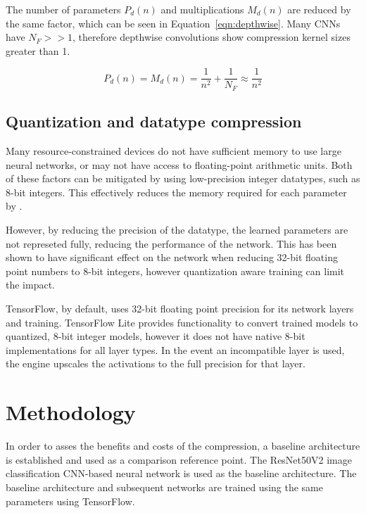 \documentclass{article}
\begin{document}
	The number of parameters $P_d(n)$ and multiplications $M_d(n)$ are reduced by the same factor, which can be seen in Equation~\ref{eqn:depthwise}. Many CNNs have $N_F >> 1$, therefore depthwise convolutions show compression kernel sizes greater than 1. 

	\begin{equation} \label{eqn:depthwise}
		P_d(n) = M_d(n) = \frac{1}{n^2} + \frac{1}{N_F} \approx \frac{1}{n^2}
	\end{equation}
	
	
	\subsection{Quantization and datatype compression}
	
	Many resource-constrained devices do not have sufficient memory to use large neural networks, or may not have access to floating-point arithmetic units. Both of these factors can be mitigated by using low-precision integer datatypes, such as 8-bit integers. This effectively reduces the memory required for each parameter by . 
	
	However, by reducing the precision of the datatype, the learned parameters are not represeted fully, reducing the performance of the network. This has been shown to have significant effect on the network when reducing 32-bit floating point numbers to 8-bit integers, however quantization aware training can limit the impact. 
	
	TensorFlow, by default, uses 32-bit floating point precision for its network layers and training. TensorFlow Lite provides functionality to convert trained models to quantized, 8-bit integer models, however it does not have native 8-bit implementations for all layer types. In the event an incompatible layer is used, the engine upscales the activations to the full precision for that layer.
	
	\section{Methodology}
	In order to asses the benefits and costs of the compression, a baseline architecture is established and used as a comparison reference point. The ResNet50V2 image classification CNN-based neural network is used as the baseline architecture. The baseline architecture and subsequent networks are trained using the same parameters using TensorFlow. 
	
\end{document}

